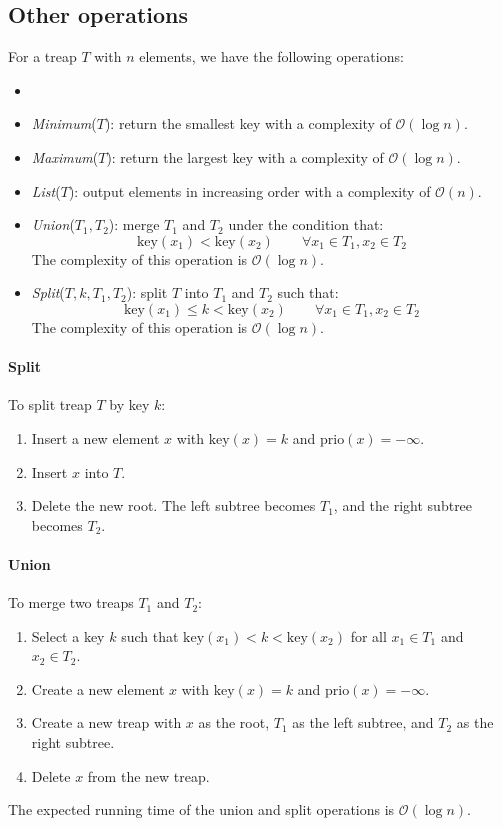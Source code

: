 \subsection{Other operations}
For a treap $T$ with $n$ elements, we have the following operations:
\begin{itemize}
    \item 
    \item \textit{Minimum}($T$): return the smallest key with a complexity of $\mathcal{O}(\log n)$. 
    \item \textit{Maximum}($T$): return the largest key with a complexity of $\mathcal{O}(\log n)$. 
    \item \textit{List}($T$): output elements in increasing order with a complexity of $\mathcal{O}(n)$.
    \item \textit{Union}($T_1,T_2$): merge $T_1$ and $T_2$ under the condition that:
        \[\text{key}(x_1) < \text{key}(x_2) \qquad\forall x_1 \in T_1,x_2 \in T_2 \]
        The complexity of this operation is $\mathcal{O}(\log n)$. 
    \item \textit{Split}($T,k,T_1,T_2$): split $T$ into $T_1$ and $T_2$ such that: 
        \[\text{key}(x_1) \leq k < \text{key}(x_2)\qquad\forall x_1 \in T_1,x_2 \in T_2\]
        The complexity of this operation is $\mathcal{O}(\log n)$. 
\end{itemize}

\paragraph*{Split}
To split treap $T$ by key $k$:
\begin{enumerate}
    \item Insert a new element $x$ with $\text{key}(x) = k$ and $\text{prio}(x) = -\infty$.
    \item Insert $x$ into $T$.
    \item Delete the new root. The left subtree becomes $T_1$, and the right subtree becomes $T_2$.
\end{enumerate}

\paragraph*{Union}
To merge two treaps $T_1$ and $T_2$:
\begin{enumerate}
    \item Select a key $k$ such that $\text{key}(x_1) < k < \text{key}(x_2)$ for all $x_1 \in T_1$ and $x_2 \in T_2$.
    \item Create a new element $x$ with $\text{key}(x) = k$ and $\text{prio}(x) = -\infty$.
    \item Create a new treap with $x$ as the root, $T_1$ as the left subtree, and $T_2$ as the right subtree.
    \item Delete $x$ from the new treap.
\end{enumerate}
\begin{lemma} 
    The expected running time of the union and split operations is $\mathcal{O}(\log n)$. 
\end{lemma}

